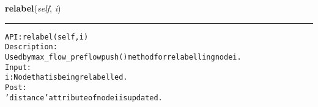 \hspace{.8\funcindent}\begin{boxedminipage}{\funcwidth}

    \raggedright \textbf{relabel}(\textit{self}, \textit{i})

    \vspace{-1.5ex}

    \rule{\textwidth}{0.5\fboxrule}
\setlength{\parskip}{2ex}
\begin{alltt}

API: relabel(self, i)
Description:
Used by max\_flow\_preflowpush() method for relabelling node i.
Input:
    i: Node that is being relabelled.
Post:
    'distance' attribute of node i is updated.
\end{alltt}

\setlength{\parskip}{1ex}
    \end{boxedminipage}

    \label{coinor:gimpy:graph:Graph:search}

    \vspace{0.5ex}

